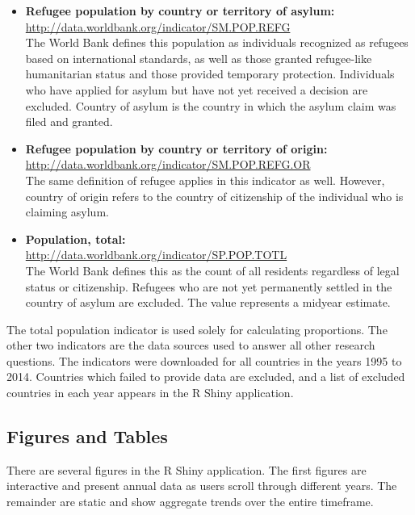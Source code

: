 \documentclass{article}
\begin{document}
\begin{itemize}
\item \textbf{Refugee population by country or territory of asylum:}\\
\url{http://data.worldbank.org/indicator/SM.POP.REFG} \\
\noindent The World Bank defines this population as individuals recognized as refugees based on international standards, as well as those granted refugee-like humanitarian status and those provided temporary protection. Individuals who have applied for asylum but have not yet received a decision are excluded. Country of asylum is the country in which the asylum claim was filed and granted.
\item \textbf{Refugee population by country or territory of origin:}\\
\url{http://data.worldbank.org/indicator/SM.POP.REFG.OR}\\
\noindent The same definition of refugee applies in this indicator as well. However, country of origin refers to the country of citizenship of the individual who is claiming asylum.
\item \textbf{Population, total:}\\
\url{http://data.worldbank.org/indicator/SP.POP.TOTL}\\
\noindent The World Bank defines this as the count of all residents regardless of legal status or citizenship. Refugees who are not yet permanently settled in the country of asylum are excluded. The value represents a midyear estimate.
\end{itemize}
\noindent The total population indicator is used solely for calculating proportions. The other two indicators are the data sources used to answer all other research questions. The indicators were downloaded for all countries in the years 1995 to 2014. Countries which failed to provide data are excluded, and a list of excluded countries in each year appears in the R Shiny application.


\subsection{Figures and Tables}

\noindent There are several figures in the R Shiny application. The first figures are interactive and present annual data as users scroll through different years. The remainder are static and show aggregate trends over the entire timeframe.\vspace{2mm}
\end{document}
